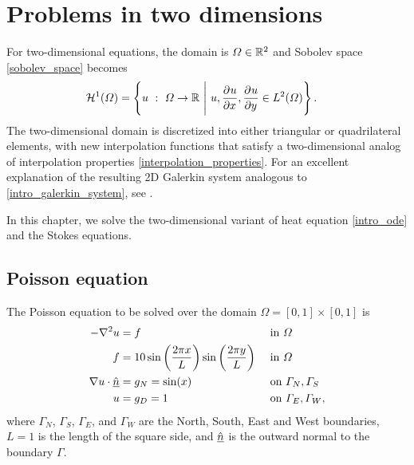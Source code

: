 
\chapter{Problems in two dimensions}

For two-dimensional equations, the domain is $\varOmega \in \mathbb{R}^2$ and Sobolev space \cref{sobolev_space} becomes
\begin{align}
  \label{2d_sobolev_space}
  \mathcal{H}^1(\Omega) &= \left\{ u\ :\ \Omega \rightarrow \R\ \Bigg|\ u, \parder{u}{x}, \parder{u}{y} \in L^2(\Omega) \right\}.
\end{align}
The two-dimensional domain is discretized into either triangular or quadrilateral elements, with new interpolation functions that satisfy a two-dimensional analog of interpolation properties \cref{interpolation_properties}.  For an excellent explanation of the resulting 2D Galerkin system analogous to \cref{intro_galerkin_system}, see \citet{elman_2005}.

In this chapter, we solve the two-dimensional variant of heat equation \cref{intro_ode} and the Stokes equations.




\section{Poisson equation}

The Poisson equation to be solved over the domain $\Omega = [0,1] \times [0,1]$ is
\begin{subequations}
\label{2d_poisson}
\begin{align}
  -\nabla^2 u &= f &&\text{ in } \varOmega \\
  f &= 10 \sin\left(\frac{2\pi x}{L}\right) \sin\left(\frac{2\pi y}{L}\right) &&\text{ in } \varOmega \\
  \nabla u \cdot \underline{\hat{n}} &= g_N = \sin(x) &&\text{ on } \varGamma_N, \varGamma_S \\
  u &= g_D = 1 &&\text{ on } \varGamma_E, \varGamma_W,
\end{align}
\end{subequations}
where $\Gamma_N$, $\Gamma_S$, $\Gamma_E$, and $\Gamma_W$ are the North, South, East and West boundaries, $L=1$ is the length of the square side, and $\underline{\hat{n}}$ is the outward normal to the boundary $\Gamma$.

